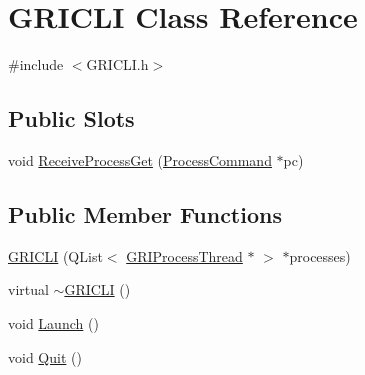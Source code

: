 \hypertarget{classGRICLI}{\section{\-G\-R\-I\-C\-L\-I \-Class \-Reference}
\label{classGRICLI}
}


{\ttfamily \#include $<$\-G\-R\-I\-C\-L\-I.\-h$>$}

\subsection*{\-Public \-Slots}
\begin{DoxyCompactItemize}
\item 
void \hyperlink{classGRICLI_a6ab2fa3bf247c4fec9ff6b595b188b34}{\-Receive\-Process\-Get} (\hyperlink{structProcessCommand}{\-Process\-Command} $\ast$pc)
\end{DoxyCompactItemize}
\subsection*{\-Public \-Member \-Functions}
\begin{DoxyCompactItemize}
\item 
\hyperlink{classGRICLI_a9aa4a6ba0951c97e617fd6be0c10f448}{\-G\-R\-I\-C\-L\-I} (\-Q\-List$<$ \hyperlink{classGRIProcessThread}{\-G\-R\-I\-Process\-Thread} $\ast$ $>$ $\ast$processes)
\item 
virtual \hyperlink{classGRICLI_abc1d534f08f1a459a1364e5b7f26c489}{$\sim$\-G\-R\-I\-C\-L\-I} ()
\item 
void \hyperlink{classGRICLI_a97689492f2a9a5a274551233a47e5732}{\-Launch} ()
\item 
void \hyperlink{classGRICLI_ac09c912e6b7135ccbc157d2f6debc564}{\-Quit} ()
\end{DoxyCompactItemize}
